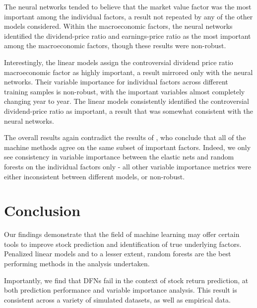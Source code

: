 \documentclass{article}
\begin{document}
The neural networks tended to believe that the market value factor was the most important among the individual factors, a result not repeated by any of the other models considered. Within the macroeconomic factors, the neural networks identified the dividend-price ratio and earnings-price ratio as the most important among the macroeconomic factors, though these results were non-robust.

Interestingly, the linear models assign the controversial dividend price ratio macroeconomic factor as highly important, a result mirrored only with the neural networks. Their variable importance for individual factors across different training samples is non-robust, with the important variables almost completely changing year to year. The linear models consistently identified the controversial dividend-price ratio as important, a result that was somewhat consistent with the neural networks. 

The overall results again contradict the results of \cite{gu_empirical_2018}, who conclude that all of the machine methods agree on the same subset of important factors. Indeed, we only see consistency in variable importance between the elastic nets and random forests on the individual factors only - all other variable importance metrics were either inconsistent between different models, or non-robust.


\section{Conclusion}

Our findings demonstrate that the field of machine learning may offer certain tools to improve stock prediction and identification of true underlying factors. Penalized linear models and to a lesser extent, random forests are the best performing methods in the analysis undertaken.

Importantly, we find that DFNs fail in the context of stock return prediction, at both prediction performance and variable importance analysis. This result is consistent across a variety of simulated datasets, as well as empirical data. 
\end{document}
